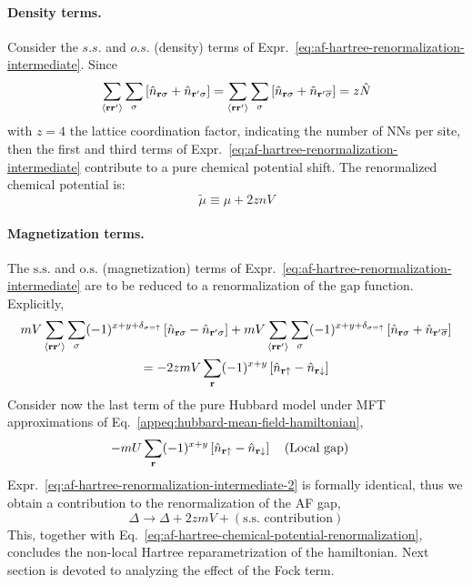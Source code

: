 \paragraph{Density terms.}

Consider the $s.s.$ and $o.s.$ (density) terms of Expr.~\eqref{eq:af-hartree-renormalization-intermediate}. Since
\[
	\sum_{\ev{\mathbf{r}\mathbf{r}'}} \sum_\sigma \left[
		\hat n_{\mathbf{r}\sigma} + \hat n_{\mathbf{r}'\sigma}
	\right] = \sum_{\ev{\mathbf{r}\mathbf{r}'}} \sum_\sigma \left[
		\hat n_{\mathbf{r}\sigma} + \hat n_{\mathbf{r}'\overline{\sigma}}
	\right] = z \hat N
\]
with $z=4$ the lattice coordination factor, indicating the number of NNs per site, then the first and third terms of Expr.~\eqref{eq:af-hartree-renormalization-intermediate} contribute to a pure chemical potential shift. The renormalized chemical potential is:
\begin{equation}\label{eq:af-hartree-chemical-potential-renormalization}
	\tilde{\mu} \equiv \mu + 2znV
\end{equation}

\paragraph{Magnetization terms.}

The $\mathrm{s.s.}$ and $\mathrm{o.s.}$ (magnetization) terms of Expr.~\eqref{eq:af-hartree-renormalization-intermediate} are to be reduced to a renormalization of the gap function. Explicitly,
\begin{multline}
	mV \sum_{\ev{\mathbf{r}\mathbf{r}'}} \sum_\sigma (-1)^{x+y+\delta_{\sigma=\uparrow}} \left[
		\hat n_{\mathbf{r}\sigma} - \hat n_{\mathbf{r}'\sigma}
	\right] + mV \sum_{\ev{\mathbf{r}\mathbf{r}'}} \sum_\sigma (-1)^{x+y+\delta_{\sigma=\uparrow}} \left[
		\hat n_{\mathbf{r}\sigma} + \hat n_{\mathbf{r}'\overline{\sigma}}
	\right] \\
	= -2zmV \sum_\mathbf{r} (-1)^{x+y} \left[
		\hat n_{\mathbf{r}\uparrow} - \hat n_{\mathbf{r}\downarrow}
	\right] \label{eq:af-hartree-renormalization-intermediate-2}
\end{multline}
Consider now the last term of the pure Hubbard model under MFT approximations of Eq.~\eqref{appeq:hubbard-mean-field-hamiltonian},
\[
	- mU \sum_\mathbf{r} (-1)^{x+y} \left[
		\hat n_{\mathbf{r}\uparrow} - \hat n_{\mathbf{r}\downarrow}
	\right]
	\qq{(Local gap)}
\]
Expr.~\eqref{eq:af-hartree-renormalization-intermediate-2} is formally identical, thus we obtain a contribution to the renormalization of the AF gap,
\begin{equation}\label{eq:af-hartree-gap-os-renormalization}
	\Delta \to \Delta + 2zmV + (\text{s.s. contribution})
\end{equation}
This, together with Eq.~\eqref{eq:af-hartree-chemical-potential-renormalization}, concludes the non-local Hartree reparametrization of the hamiltonian. Next section is devoted to analyzing the effect of the Fock term.

